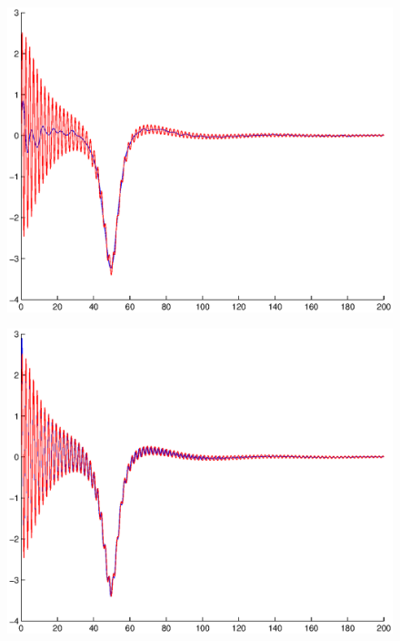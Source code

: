 \documentclass[A4paper,11pt]{article}
\theoremstyle{definition}
\begin{document}
\begin{figure}[H]
\centering
\begin{minipage}{.33\textwidth}
  \centering
  \vspace{0.22cm}
  \includegraphics[scale=0.25]{pictures/Example8/Fig5.eps}
  \label{fig:8_5}
\end{minipage}%
\begin{minipage}{.33\textwidth}
  \centering
  \vspace{0.2cm}
  \includegraphics[scale=0.25]{pictures/Example8/Fig6.eps}
  \label{fig:8_6}
\end{minipage}%
\begin{minipage}{.33\textwidth}

\end{minipage}
\end{figure}
\end{document}
